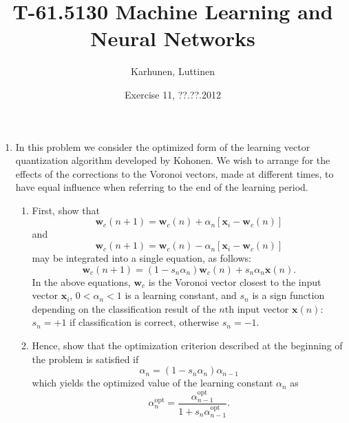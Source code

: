 
\title{T-61.5130 Machine Learning and Neural Networks}
\author{Karhunen, Luttinen}
\date{Exercise 11, ??.??.2012}

\newcommand{\vect}[1]{{\bf{#1}}}
\newcommand{\svect}[1]{\boldsymbol{#1}}
\newcommand{\matr}[1]{\boldsymbol{#1}}




\maketitle

\begin{enumerate}

\item In this problem we consider the optimized form of the learning
  vector quantization algorithm developed by
  Kohonen. We wish to arrange for the effects of the corrections to the
  Voronoi vectors, made at different times, to have equal influence when
  referring to the end of the learning period. \begin{enumerate}
  \item First, show that
    \begin{equation}
      \mathbf{w}_c(n+1)=\mathbf{w}_c(n)+\alpha_n[\mathbf{x}_i-\mathbf{w}_c(n)]
      \label{equation: 1}
    \end{equation}
    and
    \begin{equation}
      \mathbf{w}_c(n+1)=\mathbf{w}_c(n)-\alpha_n[\mathbf{x}_i-\mathbf{w}_c(n)]
      \label{equation: 2}
    \end{equation}
    may be integrated into a single equation, as follows:
    \begin{equation}
      \mathbf{w}_c(n+1)=(1-s_n\alpha_n)\mathbf{w}_c(n)+s_n\alpha_n\mathbf{x}(n).
      \label{equation: 3}
    \end{equation}
    In the above equations, $\mathbf{w}_c$ is the Voronoi
    vector closest to the input vector $\mathbf{x}_i$, $0<\alpha_n<1$ is a
    learning constant, and $s_n$ is a sign function depending on the
    classification result of the $n$th input vector $\mathbf{x}(n)$:
    $s_n=+1$ if classification is correct, otherwise  $s_n=-1$.

  \item Hence, show that the optimization criterion described at the
    beginning of the problem is satisfied if
    \begin{equation*}
      \alpha_n=(1-s_n\alpha_n)\alpha_{n-1}
    \end{equation*}
    which yields the optimized value of the learning constant
    $\alpha_n$ as
    \begin{equation*}
      \alpha_n^{\text{opt}}=\frac{\alpha_{n-1}^{\text{opt}}}{1+s_n\alpha_{n-1}^{\text{opt}}}.
    \end{equation*}
  \end{enumerate}


\end{enumerate}
